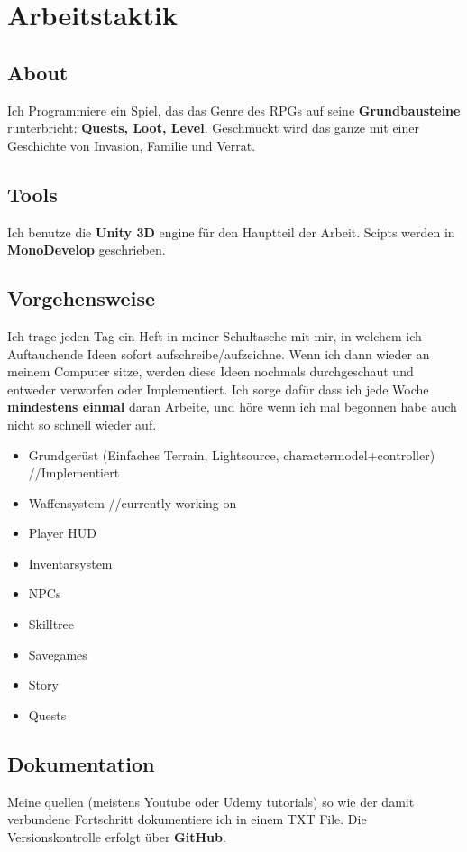 \section{Arbeitstaktik}


\subsection{About}

Ich Programmiere ein Spiel, das das Genre des RPGs auf seine \textbf{Grundbausteine} runterbricht: \textbf{Quests, Loot, Level}. Geschmückt wird das ganze mit einer Geschichte von Invasion, Familie und Verrat.

\subsection{Tools}
Ich benutze die \textbf{Unity 3D} engine für den Hauptteil der Arbeit. Scipts werden in \textbf{MonoDevelop} geschrieben.


\subsection{Vorgehensweise} Ich trage jeden Tag ein Heft in meiner Schultasche mit mir, in welchem ich Auftauchende Ideen sofort aufschreibe/aufzeichne.
Wenn ich dann wieder an meinem Computer sitze, werden diese Ideen nochmals durchgeschaut und entweder verworfen oder Implementiert.
Ich sorge dafür dass ich jede Woche \textbf{mindestens einmal} daran Arbeite, und höre wenn ich mal begonnen habe auch nicht so schnell wieder auf.


\begin{itemize}
\item Grundgerüst (Einfaches Terrain, Lightsource, charactermodel+controller) //Implementiert
\item Waffensystem	//currently working on
\item Player HUD
\item Inventarsystem
\item NPCs
\item Skilltree
\item Savegames
\item Story
\item Quests

\end{itemize}

\subsection{Dokumentation}
Meine quellen (meistens Youtube oder Udemy tutorials) so wie der damit verbundene Fortschritt dokumentiere ich in einem TXT File.
Die Versionskontrolle erfolgt über \textbf{GitHub}.
